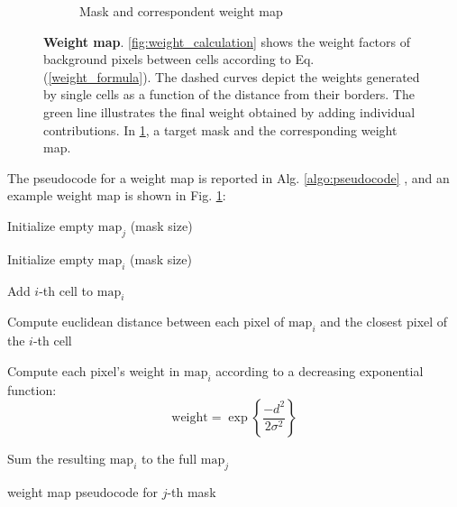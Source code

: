 \begin{figure}
{\begin{subfigure}[]{0.62\textwidth}
         \caption{Mask and correspondent weight map}
         \label{fig:weight_map_example}
     \end{subfigure}
}
\caption{\textbf{Weight map}. 
\ref{fig:weight_calculation} shows the weight factors of background pixels between cells according to Eq. (\ref{weight_formula}). The dashed curves depict the weights generated by single cells as a function of the distance from their borders.
The green line illustrates the final weight obtained by adding individual contributions. 
In \ref{fig:weight_map_example}, a target mask and the corresponding weight map.} 
\label{fig:weight_map}
\end{figure}
The pseudocode for a weight map is reported in Alg. \ref{algo:pseudocode}%
, and an example weight map is shown in Fig. \ref{fig:weight_map_example}:
\begin{algorithm}[H]
\DontPrintSemicolon
     Initialize empty $\text{map}_j$ (mask size)
    {
         Initialize empty $\text{map}_i$  (mask size) 
        
         Add $i$-th cell to $\text{map}_i$
        
         Compute euclidean distance between each pixel of $\text{map}_i$ and the closest pixel of the $i$-th cell \label{step:distance}
        
         Compute each pixel's weight in $\text{map}_i$ according to a decreasing exponential function:
        \begin{equation}
        \text{weight} = \exp\left\{\dfrac{-d^{2}}{2\sigma^{2}}\right\}
        \label{weight_formula}
        \end{equation}
        
        
    Sum the resulting $\text{map}_i$ to the full $\text{map}_j$
}
\caption{weight map pseudocode for $j$-th mask}
\label{algo:pseudocode}
\end{algorithm}
